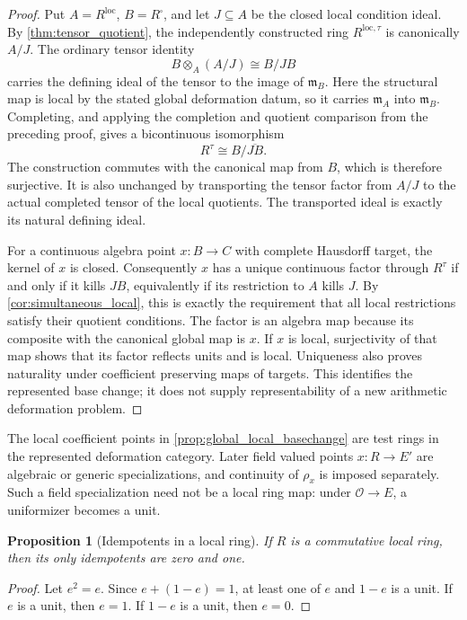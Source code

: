 \documentclass[11pt]{amsart}
\newtheorem{proposition}[proposition]{Proposition}
\theoremstyle{definition}
\theoremstyle{remark}
\newcommand{\OO}{\mathcal O}
\newcommand{\frakm}{\mathfrak m}
\begin{document}
\begin{proof}
Put \(A=R^{\mathrm{loc}}\), \(B=R^\square\), and let \(J\subseteq A\) be the closed local condition ideal. By \cref{thm:tensor_quotient}, the independently constructed ring \(R^{\mathrm{loc},\tau}\) is canonically \(A/J\). The ordinary tensor identity
\[
B\otimes_A(A/J)\cong B/JB
\]
carries the defining ideal of the tensor to the image of \(\frakm_B\). Here the structural map is local by the stated global deformation datum, so it carries \(\frakm_A\) into \(\frakm_B\). Completing, and applying the completion and quotient comparison from the preceding proof, gives a bicontinuous isomorphism
\[
R^\tau\cong B/\overline{JB}.
\]
The construction commutes with the canonical map from \(B\), which is therefore surjective. It is also unchanged by transporting the tensor factor from \(A/J\) to the actual completed tensor of the local quotients. The transported ideal is exactly its natural defining ideal.

For a continuous algebra point \(x:B\to C\) with complete Hausdorff target, the kernel of \(x\) is closed. Consequently \(x\) has a unique continuous factor through \(R^\tau\) if and only if it kills \(JB\), equivalently if its restriction to \(A\) kills \(J\). By \cref{cor:simultaneous_local}, this is exactly the requirement that all local restrictions satisfy their quotient conditions. The factor is an algebra map because its composite with the canonical global map is \(x\). If \(x\) is local, surjectivity of that map shows that its factor reflects units and is local. Uniqueness also proves naturality under coefficient preserving maps of targets. This identifies the represented base change; it does not supply representability of a new arithmetic deformation problem.
\end{proof}

The local coefficient points in \cref{prop:global_local_basechange} are test rings in the represented deformation category. Later field valued points \(x:R\to E'\) are algebraic or generic specializations, and continuity of \(\rho_x\) is imposed separately. Such a field specialization need not be a local ring map: under \(\OO\to E\), a uniformizer becomes a unit.

\begin{proposition}[Idempotents in a local ring]\label{prop:local_idempotent}
If \(R\) is a commutative local ring, then its only idempotents are zero and one.
\end{proposition}

\begin{proof}
Let \(e^2=e\). Since \(e+(1-e)=1\), at least one of \(e\) and \(1-e\) is a unit. If \(e\) is a unit, then \(e=1\). If \(1-e\) is a unit, then \(e=0\).
\end{proof}
\end{document}
